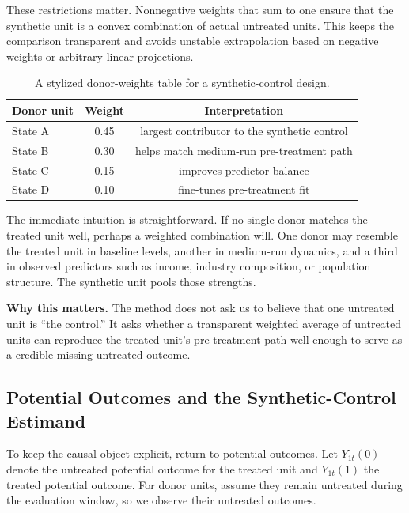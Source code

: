 These restrictions matter. Nonnegative weights that sum to one ensure that the synthetic unit is a convex combination of actual untreated units. This keeps the comparison transparent and avoids unstable extrapolation based on negative weights or arbitrary linear projections.

\begin{table}[h]
\centering
\small
\begin{tabular}{lcc}
\toprule
Donor unit & Weight & Interpretation \\
\midrule
State A & 0.45 & largest contributor to the synthetic control \\
State B & 0.30 & helps match medium-run pre-treatment path \\
State C & 0.15 & improves predictor balance \\
State D & 0.10 & fine-tunes pre-treatment fit \\
\bottomrule
\end{tabular}
\caption{A stylized donor-weights table for a synthetic-control design.}
\label{tab:sc_weights}
\end{table}

The immediate intuition is straightforward. If no single donor matches the treated unit well, perhaps a weighted combination will. One donor may resemble the treated unit in baseline levels, another in medium-run dynamics, and a third in observed predictors such as income, industry composition, or population structure. The synthetic unit pools those strengths.

\begin{boxD}
\textbf{Why this matters.}
The method does not ask us to believe that one untreated unit is ``the control.'' It asks whether a transparent weighted average of untreated units can reproduce the treated unit's pre-treatment path well enough to serve as a credible missing untreated outcome.
\end{boxD}

\subsection{Potential Outcomes and the Synthetic-Control Estimand}
\hypertarget{main:sc-po}{}
To keep the causal object explicit, return to potential outcomes. Let $Y_{1t}(0)$ denote the untreated potential outcome for the treated unit and $Y_{1t}(1)$ the treated potential outcome. For donor units, assume they remain untreated during the evaluation window, so we observe their untreated outcomes.

